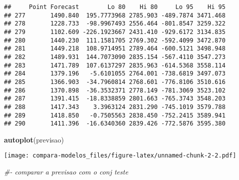 \documentclass[
]{article}
\newenvironment{Shaded}{\begin{snugshade}}{\end{snugshade}}
\newcommand{\CommentTok}[1]{\textcolor[rgb]{0.56,0.35,0.01}{\textit{#1}}}
\newcommand{\KeywordTok}[1]{\textcolor[rgb]{0.13,0.29,0.53}{\textbf{#1}}}
\newcommand{\NormalTok}[1]{#1}
\begin{document}
\begin{verbatim}
##     Point Forecast        Lo 80    Hi 80     Lo 95    Hi 95
## 277       1490.840  195.7773968 2785.903 -489.7874 3471.468
## 278       1228.733  -98.9967493 2556.464 -801.8547 3259.322
## 279       1102.609 -226.1923667 2431.410 -929.6172 3134.835
## 280       1440.230  111.1581705 2769.302 -592.4099 3472.870
## 281       1449.218  108.9714951 2789.464 -600.5121 3498.948
## 282       1489.931  144.7073090 2835.154 -567.4110 3547.273
## 283       1471.789  107.6137297 2835.963 -614.5368 3558.114
## 284       1379.196   -5.6101055 2764.001 -738.6819 3497.073
## 285       1366.903  -34.7960814 2768.601 -776.8106 3510.616
## 286       1370.898  -36.3532371 2778.149 -781.3069 3523.102
## 287       1391.415  -18.8338859 2801.663 -765.3743 3548.203
## 288       1417.343    3.3963124 2831.290 -745.1019 3579.788
## 289       1418.850   -0.7505563 2838.450 -752.2415 3589.941
## 290       1411.396  -16.6340360 2839.426 -772.5876 3595.380
\end{verbatim}

\begin{Shaded}
\begin{Highlighting}[]
\KeywordTok{autoplot}\NormalTok{(previsao)}
\end{Highlighting}
\end{Shaded}

\texttt{[image: compara-modelos\_files/figure-latex/unnamed-chunk-2-2.pdf]}

\begin{Shaded}
\begin{Highlighting}[]
\CommentTok{#- comparar a previsao com o conj teste}
\end{Highlighting}
\end{Shaded}
\end{document}
